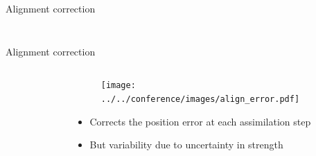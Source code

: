\documentclass[aspectratio=169]{beamer} %
\begin{document}
\begin{frame}{Alignment correction}
\begin{columns}[c]
\begin{column}{0.55\textwidth}
\begin{figure}[c]
\begin{subfigure}{0.49\textwidth}
                \end{subfigure}
            \end{figure}
        \end{column}
    \end{columns}

    \vspace{-0.25cm}

    \vspace{-0.25cm}
\end{frame}


\begin{frame}{Alignment correction}
    \vspace{-0.5cm}
    \begin{columns}
        \begin{column}{0.5\textwidth}
            \begin{figure}
                \centering
            \end{figure}
        \end{column}
        \begin{column}{0.5\textwidth}
            \begin{figure}
                \centering
                \texttt{[image: ../../conference/images/align\_error.pdf]}
            \end{figure}
            \begin{itemize}
                \item Corrects the position error at each assimilation step
                \item But variability due to uncertainty in strength
            \end{itemize}
        \end{column}
    \end{columns}
\end{frame}
\end{document}
